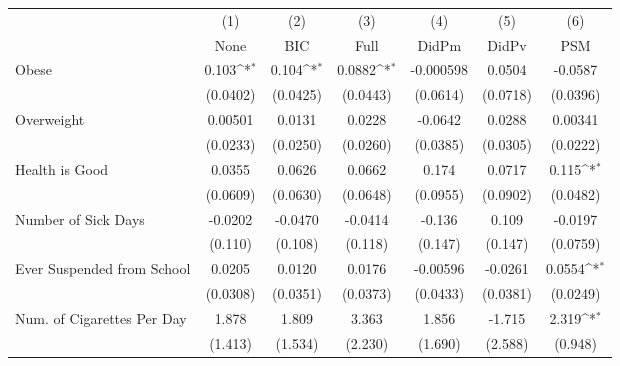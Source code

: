 {
\def\sym#1{\ifmmode^{#1}\else\(^{#1}\)\fi}
\begin{tabular}{l*{6}{c}}
\toprule
            &\multicolumn{1}{c}{(1)}&\multicolumn{1}{c}{(2)}&\multicolumn{1}{c}{(3)}&\multicolumn{1}{c}{(4)}&\multicolumn{1}{c}{(5)}&\multicolumn{1}{c}{(6)}\\
            &\multicolumn{1}{c}{None}&\multicolumn{1}{c}{BIC}&\multicolumn{1}{c}{Full}&\multicolumn{1}{c}{DidPm}&\multicolumn{1}{c}{DidPv}&\multicolumn{1}{c}{PSM}\\
\midrule
Obese       &       0.103\sym{*}  &       0.104\sym{*}  &      0.0882\sym{*}  &   -0.000598         &      0.0504         &     -0.0587         \\
            &    (0.0402)         &    (0.0425)         &    (0.0443)         &    (0.0614)         &    (0.0718)         &    (0.0396)         \\
\addlinespace
Overweight  &     0.00501         &      0.0131         &      0.0228         &     -0.0642         &      0.0288         &     0.00341         \\
            &    (0.0233)         &    (0.0250)         &    (0.0260)         &    (0.0385)         &    (0.0305)         &    (0.0222)         \\
\addlinespace
Health is Good&      0.0355         &      0.0626         &      0.0662         &       0.174         &      0.0717         &       0.115\sym{*}  \\
            &    (0.0609)         &    (0.0630)         &    (0.0648)         &    (0.0955)         &    (0.0902)         &    (0.0482)         \\
\addlinespace
Number of Sick Days&     -0.0202         &     -0.0470         &     -0.0414         &      -0.136         &       0.109         &     -0.0197         \\
            &     (0.110)         &     (0.108)         &     (0.118)         &     (0.147)         &     (0.147)         &    (0.0759)         \\
\addlinespace
Ever Suspended from School&      0.0205         &      0.0120         &      0.0176         &    -0.00596         &     -0.0261         &      0.0554\sym{*}  \\
            &    (0.0308)         &    (0.0351)         &    (0.0373)         &    (0.0433)         &    (0.0381)         &    (0.0249)         \\
\addlinespace
Num. of Cigarettes Per Day&       1.878         &       1.809         &       3.363         &       1.856         &      -1.715         &       2.319\sym{*}  \\
            &     (1.413)         &     (1.534)         &     (2.230)         &     (1.690)         &     (2.588)         &     (0.948)         \\
\bottomrule
\end{tabular}
}
